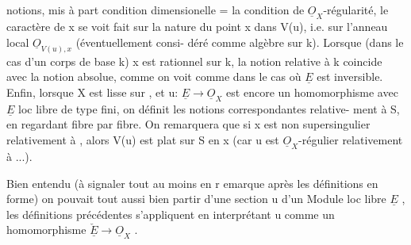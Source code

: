 
notions, mis à part  condition dimensionelle = la condition de
$\underline{O}_X$-régularité, le caractère de x se voit   fait sur la nature du
point x dans V(u), i.e. sur l'anneau local $\underline{O}_{V(u),x}$ (éventuellement consi-%
déré comme algèbre sur k). Lorsque (dans le cas d'un corps de base k)
x est rationnel sur k, la notion relative à k coincide avec la notion
absolue, comme on voit  comme dans le cas où $\underline{E}$ est inversible. Enfin,
lorsque X est lisse sur , et u: $\underline{E}\to\underline{O}_X$ est encore un homomorphisme avec
$\underline{E}$ loc libre de type fini, on définit les notions correspondantes relative-%
ment à S, en regardant fibre par fibre. On remarquera que si x est
non supersingulier relativement à , alors V(u) est plat sur S  en
x (car u est $\underline{O}_X$-régulier relativement à  ...).

 Bien entendu (à signaler tout au moins en r emarque après les
définitions en forme) on pouvait tout aussi bien partir d'une section u
d'un Module loc libre $\underline{E}$ , les définitions précédentes s'appliquent en
interprétant u comme un homomorphisme $\check{\underline{E}}\longrightarrow\underline{O}_X$ .

